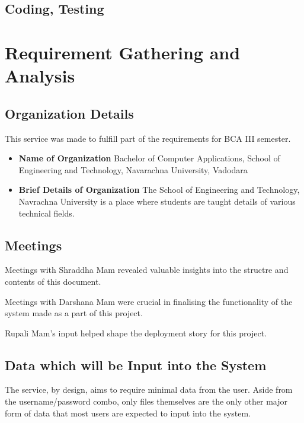 \documentclass[12pt,a4paper]{report}
\begin{document}
\section{Coding, Testing}

\newpage
\chapter{Requirement Gathering and Analysis}\label{sec:requirement_gathering_and_analysis}
\section{Organization Details}\label{sec:organization_details}

This service was made to fulfill part of the requirements for BCA III semester.

\begin{itemize}
	\item \textbf{Name of Organization}
	      Bachelor of Computer Applications, School of Engineering and Technology, Navarachna University, Vadodara

	\item \textbf{Brief Details of Organization}
	      The School of Engineering and Technology, Navrachna University is a place where students are taught details of various technical fields.
\end{itemize}

\section{Meetings}\label{sec:meetings}
Meetings with Shraddha Mam revealed valuable insights into the structre and contents of this document.

Meetings with Darshana Mam were crucial in finalising the functionality of the system made as a part of this project.

Rupali Mam's input helped shape the deployment story for this project.
\section{Data which will be Input into the System}\label{sec:data_which_will_be_input_into_system}
The service, by design, aims to require minimal data from the user. Aside from the username/password combo, only files themselves are the only other major form of data that most users are expected to input into the system.
\end{document}
